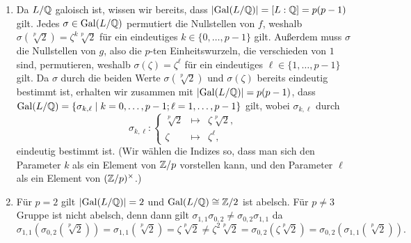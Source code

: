 \begin{solution}
\begin{enumerate}
    \item
      Da $L/\mathbb{Q}$ galoisch ist, wissen wir bereits, dass $|{\operatorname{Gal}(L/\mathbb{Q})}| = [L : \mathbb{Q}] = p(p-1)$ gilt.
      Jedes $\sigma \in \operatorname{Gal}(L/\mathbb{Q})$ permutiert die Nullstellen von $f$, weshalb $\sigma(\sqrt[p]{2}) = \zeta^k \sqrt[p]{2}$ für ein eindeutiges $k \in \{0, \dotsc, p-1\}$ gilt.
      Außerdem muss $\sigma$ die Nullstellen von $g$, also die $p$-ten Einheitswurzeln, die verschieden von $1$ sind, permutieren, weshalb $\sigma(\zeta) = \zeta^\ell$ für ein eindeutiges $\ell \in \{1, \dotsc, p-1\}$ gilt.
      Da $\sigma$ durch die beiden Werte $\sigma(\sqrt[p]{2})$ und $\sigma(\zeta)$ bereits eindeutig bestimmt ist, erhalten wir zusammen mit $|{\operatorname{Gal}(L/\mathbb{Q})}| = p(p-1)$, dass $\operatorname{Gal}(L/\mathbb{Q}) = \{\sigma_{k,\ell} \mid k = 0, \dotsc, p-1; \ell = 1, \dotsc, p-1\}$ gilt, wobei $\sigma_{k,\ell}$ durch
      \[
        \sigma_{k,\ell}
        \colon
        \left\{
          \begin{array}{rcl}
            \sqrt[p]{2} & \mapsto & \zeta \sqrt[p]{2},
            \\
            \zeta       & \mapsto & \zeta^\ell,
          \end{array}
        \right.
      \]
      eindeutig bestimmt ist.
      (Wir wählen die Indizes so, dass man sich den Parameter $k$ als ein Element von $\mathbb{Z}/p$ vorstellen kann, und den Parameter $\ell$ als ein Element von $(\mathbb{Z}/p)^\times$.)
      
    \item
      Für $p = 2$ gilt $|{\operatorname{Gal}(L/\mathbb{Q})}| = 2$ und $\operatorname{Gal}(L / \mathbb{Q}) \cong \mathbb{Z}/2$ ist abelsch.
      Für $p \neq 3$ Gruppe ist nicht abelsch, denn dann gilt $\sigma_{1,1} \sigma_{0,2} \neq \sigma_{0,2} \sigma_{1,1}$ da
      \[
              \sigma_{1,1}( \sigma_{0,2}( \sqrt[p]{2} ) )
        =     \sigma_{1,1}( \sqrt[p]{2} )
        =     \zeta \sqrt[p]{2}
        \neq  \zeta^2 \sqrt[p]{2}
        =     \sigma_{0,2}( \zeta \sqrt[p]{2} )
        =     \sigma_{0,2}( \sigma_{1,1}( \sqrt[p]{2} ) ).
      \]
      

\end{enumerate}
\end{solution}
